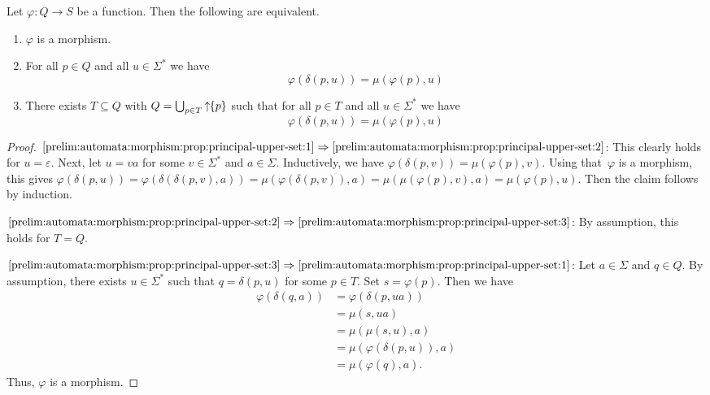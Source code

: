 \begin{proposition} \label{prelim:automata:morphism:prop:principal-upper-set}
	Let $\varphi \colon Q \to S$ be a function. Then the following are equivalent.
	
	\begin{enumerate}
		\item \label{prelim:automata:morphism:prop:principal-upper-set:1} $\varphi$ is a morphism.
		
		\item \label{prelim:automata:morphism:prop:principal-upper-set:2} For all $p \in Q$ and all $u \in \Sigma^*$
		we have
		\[
		\varphi(\delta(p, u)) = \mu(\varphi(p), u)
		\]
		
		\item \label{prelim:automata:morphism:prop:principal-upper-set:3} There exists $T \subseteq Q$ with $Q = \bigcup_{p \in T} \mbox{\ensuremath{\displaystyle \uparrow \!\!\{p\}}}$
		such that for all $p \in T$ and all $u \in \Sigma^*$ we have
		\[
		\varphi(\delta(p, u)) = \mu(\varphi(p), u)
		\]
	\end{enumerate}
\end{proposition}
\begin{proof}
	$\ref{prelim:automata:morphism:prop:principal-upper-set:1}\Rightarrow\ref{prelim:automata:morphism:prop:principal-upper-set:2}$: This clearly holds for $u = \varepsilon$.
	Next, let $u = va$ for some $v \in \Sigma^*$ and $a \in \Sigma$.
	Inductively, we have $\varphi(\delta(p, v)) = \mu(\varphi(p), v)$.
	Using that~$\varphi$ is a morphism, this gives $\varphi(\delta(p, u)) 
	= \varphi(\delta(\delta(p, v), a))
	= \mu(\varphi(\delta(p, v)), a)
	= \mu(\mu(\varphi(p), v), a)
	= \mu(\varphi(p), u)$.
	Then the claim follows by induction.
	
	$\ref{prelim:automata:morphism:prop:principal-upper-set:2}\Rightarrow\ref{prelim:automata:morphism:prop:principal-upper-set:3}$: By assumption, this holds for $T = Q$.
	
	$\ref{prelim:automata:morphism:prop:principal-upper-set:3}\Rightarrow\ref{prelim:automata:morphism:prop:principal-upper-set:1}$: Let $a \in \Sigma$ and $q \in Q$.
	By assumption, there exists $u \in \Sigma^*$ such that $q = \delta(p, u)$
	for some $p \in T$. Set $s = \varphi(p)$.
	Then we have
	\begin{align*}
		\varphi(\delta(q, a))
		& = \varphi(\delta(p, ua)) \tag{$q = \delta(p,u)$} \\
		& = \mu(s, ua)\tag{$\varphi$ morphism}  \\
		& = \mu(\mu(s, u), a) \tag{Def.~transition function} \\
		& = \mu(\varphi(\delta(p, u)), a) \tag{$\varphi(\delta(p, u)) = \mu(s, u)$} \\
		& = \mu(\varphi(q), a). \tag{$q = \delta(p,u)$}
	\end{align*}
	Thus, $\varphi$ is a morphism.
\end{proof}

